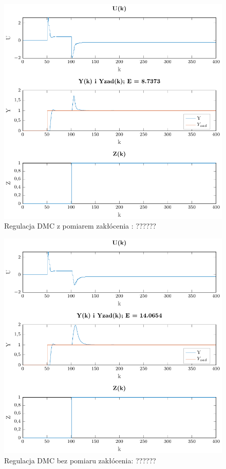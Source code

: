 \documentclass[a4paper,titlepage,11pt,twosides,floatssmall]{mwrep}
\begin{document}
\begin{figure}[H]
	\centering
	\includegraphics{../../Lab2/PDF_rysunki/Z5_DMCZZakloceniami.pdf}
	\caption{Regulacja DMC z pomiarem zakłócenia : ??????}
	\label{pom_zak}
\end{figure}

\begin{figure}[H]
	\centering
	\includegraphics{../../Lab2/PDF_rysunki/Z5_DMCZZakloceniamiBezOdsprz.pdf}
	\caption{Regulacja DMC bez pomiaru zakłócenia: ??????}
	\label{bez_pom_zak}
\end{figure}
\end{document}
